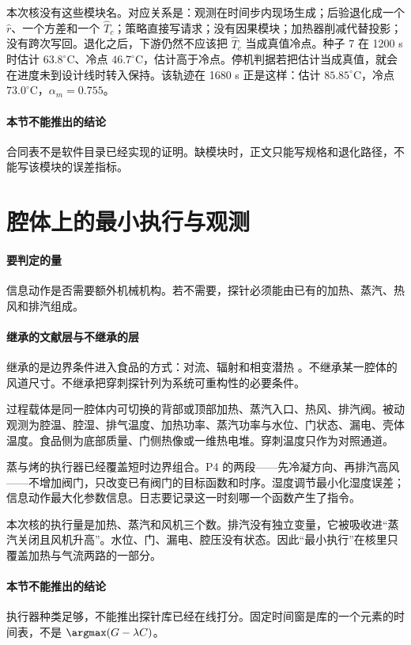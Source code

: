 本次核没有这些模块名。对应关系是：观测在时间步内现场生成；后验退化成一个 \(\hat r\)、一个方差和一个 \(\hat T_c\)；策略直接写请求；没有因果模块；加热器削减代替投影；没有跨次写回。退化之后，下游仍然不应该把 \(\hat T_c\) 当成真值冷点。种子 7 在 1200 s 时估计 \(63.8^\circ\mathrm{C}\)、冷点 \(46.7^\circ\mathrm{C}\)，估计高于冷点。停机判据若把估计当成真值，就会在进度未到设计线时转入保持。该轨迹在 1680 s 正是这样：估计 \(85.85^\circ\mathrm{C}\)，冷点 \(73.0^\circ\mathrm{C}\)，\(\alpha_m=0.755\)。

\paragraph{本节不能推出的结论}
合同表不是软件目录已经实现的证明。缺模块时，正文只能写规格和退化路径，不能写该模块的误差指标。

\section{腔体上的最小执行与观测}

\paragraph{要判定的量}
信息动作是否需要额外机械机构。若不需要，探针必须能由已有的加热、蒸汽、热风和排汽组成。

\paragraph{继承的文献层与不继承的层}
继承的是边界条件进入食品的方式：对流、辐射和相变潜热 \cite{datta2007}。不继承某一腔体的风道尺寸。不继承把穿刺探针列为系统可重构性的必要条件。

过程载体是同一腔体内可切换的背部或顶部加热、蒸汽入口、热风、排汽阀。被动观测为腔温、腔湿、排气温度、加热功率、蒸汽功率与水位、门状态、漏电、壳体温度。食品侧为底部质量、门侧热像或一维热电堆。穿刺温度只作为对照通道。

蒸与烤的执行器已经覆盖短时边界组合。P4 的两段——先冷凝方向、再排汽高风——不增加阀门，只改变已有阀门的目标函数和时序。湿度调节最小化湿度误差；信息动作最大化参数信息。日志要记录这一时刻哪一个函数产生了指令。

本次核的执行量是加热、蒸汽和风机三个数。排汽没有独立变量，它被吸收进“蒸汽关闭且风机升高”。水位、门、漏电、腔压没有状态。因此“最小执行”在核里只覆盖加热与气流两路的一部分。

\paragraph{本节不能推出的结论}
执行器种类足够，不能推出探针库已经在线打分。固定时间窗是库的一个元素的时间表，不是 \(\argmax(G-\lambda C)\)。
